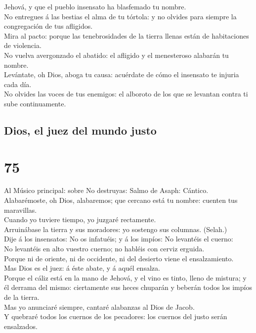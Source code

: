 Jehová, y que el pueblo insensato ha blasfemado tu nombre.\\
 No entregues á las bestias el alma de tu tórtola: y no
olvides para siempre la congregación de tus afligidos.\\
 Mira al pacto: porque las tenebrosidades de la tierra
llenas están de habitaciones de violencia.\\
 No vuelva avergonzado el abatido: el afligido y el
menesteroso alabarán tu nombre.\\
 Levántate, oh Dios, aboga tu causa: acuérdate de cómo el
insensato te injuria cada día.\\
 No olvides las voces de tus enemigos: el alboroto de los
que se levantan contra ti sube continuamente.

\hypertarget{dios-el-juez-del-mundo-justo}{%
\subsection{Dios, el juez del mundo
justo}\label{dios-el-juez-del-mundo-justo}}

\hypertarget{section-74}{%
\section{75}\label{section-74}}

 Al Músico principal: sobre No destruyas: Salmo de Asaph:
Cántico. Alabarémoste, oh Dios, alabaremos; que cercano está tu nombre:
cuenten tus maravillas.\\
 Cuando yo tuviere tiempo, yo juzgaré rectamente.\\
 Arruinábase la tierra y sus moradores: yo sostengo sus
columnas. (Selah.)\\
 Dije á los insensatos: No os infatuéis; y á los impíos:
No levantéis el cuerno:\\
 No levantéis en alto vuestro cuerno; no habléis con
cerviz erguida.\\
 Porque ni de oriente, ni de occidente, ni del desierto
viene el ensalzamiento.\\
 Mas Dios es el juez: á éste abate, y á aquél ensalza.\\
 Porque el cáliz está en la mano de Jehová, y el vino es
tinto, lleno de mistura; y él derrama del mismo: ciertamente sus heces
chuparán y beberán todos los impíos de la tierra.\\
 Mas yo anunciaré siempre, cantaré alabanzas al Dios de
Jacob.\\
 Y quebraré todos los cuernos de los pecadores: los
cuernos del justo serán ensalzados.

